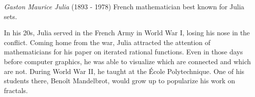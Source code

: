 \documentclass[12pt]{article}
\begin{document}
\emph{Gaston Maurice Julia} (1893 - 1978) French mathematician best known for Julia sets.

In his 20s, Julia served in the French Army in World War I, losing his nose in the conflict. Coming home from the war, Julia attracted the attention of mathematicians for his paper on iterated rational functions. Even in those days before computer graphics, he was able to visualize which  are connected and which are not. During World War II, he taught at the \'Ecole Polytechnique. One of his students there, Beno\^it Mandelbrot, would grow up to popularize his work on fractals.
\end{document}
